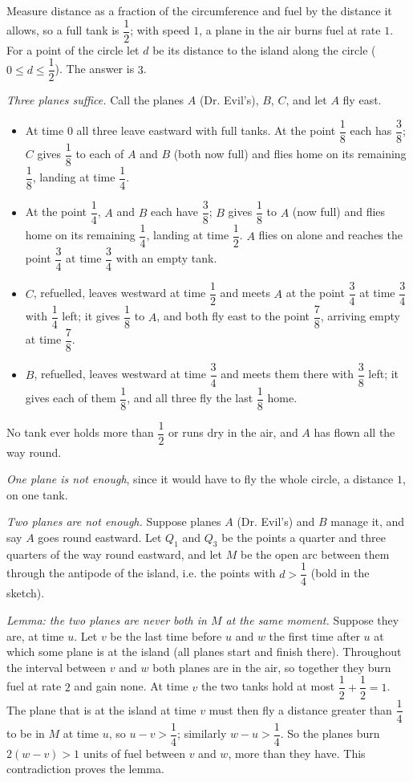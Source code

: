 Measure distance as a fraction of the circumference and fuel by the distance it allows, so a full tank is $\dfrac12$; with speed $1$, a plane in the air burns fuel at rate $1$. For a point of the circle let $d$ be its distance to the island along the circle ($0\le d\le\dfrac12$). The answer is $\boxed{3}$.

\emph{Three planes suffice.} Call the planes $A$ (Dr. Evil's), $B$, $C$, and let $A$ fly east.
\begin{itemize}
\item At time $0$ all three leave eastward with full tanks. At the point $\dfrac18$ each has $\dfrac38$; $C$ gives $\dfrac18$ to each of $A$ and $B$ (both now full) and flies home on its remaining $\dfrac18$, landing at time $\dfrac14$.
\item At the point $\dfrac14$, $A$ and $B$ each have $\dfrac38$; $B$ gives $\dfrac18$ to $A$ (now full) and flies home on its remaining $\dfrac14$, landing at time $\dfrac12$. $A$ flies on alone and reaches the point $\dfrac34$ at time $\dfrac34$ with an empty tank.
\item $C$, refuelled, leaves westward at time $\dfrac12$ and meets $A$ at the point $\dfrac34$ at time $\dfrac34$ with $\dfrac14$ left; it gives $\dfrac18$ to $A$, and both fly east to the point $\dfrac78$, arriving empty at time $\dfrac78$.
\item $B$, refuelled, leaves westward at time $\dfrac34$ and meets them there with $\dfrac38$ left; it gives each of them $\dfrac18$, and all three fly the last $\dfrac18$ home.
\end{itemize}
No tank ever holds more than $\dfrac12$ or runs dry in the air, and $A$ has flown all the way round.

\emph{One plane is not enough}, since it would have to fly the whole circle, a distance $1$, on one tank.

\emph{Two planes are not enough.} Suppose planes $A$ (Dr. Evil's) and $B$ manage it, and say $A$ goes round eastward. Let $Q_1$ and $Q_3$ be the points a quarter and three quarters of the way round eastward, and let $M$ be the open arc between them through the antipode of the island, i.e. the points with $d>\dfrac14$ (bold in the sketch).

\emph{Lemma: the two planes are never both in $M$ at the same moment.} Suppose they are, at time $u$. Let $v$ be the last time before $u$ and $w$ the first time after $u$ at which some plane is at the island (all planes start and finish there). Throughout the interval between $v$ and $w$ both planes are in the air, so together they burn fuel at rate $2$ and gain none. At time $v$ the two tanks hold at most $\dfrac12+\dfrac12=1$. The plane that is at the island at time $v$ must then fly a distance greater than $\dfrac14$ to be in $M$ at time $u$, so $u-v>\dfrac14$; similarly $w-u>\dfrac14$. So the planes burn $2(w-v)>1$ units of fuel between $v$ and $w$, more than they have. This contradiction proves the lemma.

